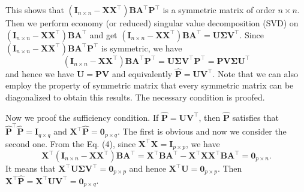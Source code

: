 \documentclass[titlepage,11pt,twoside]{article}
\begin{document}
This shows that $(\mathbf{I}_{n\times n}-\mathbf{X}\mathbf{X}^{\top})\mathbf{B}\mathbf{A}^{\top}\mathbf{P}^{\top}$ is a symmetric matrix of order $n\times n$. Then we perform economy (or reduced) singular value decomposition (SVD) on $(\mathbf{I}_{n\times n}-\mathbf{X}\mathbf{X}^{\top})\mathbf{B}\mathbf{A}^{\top}$ and get 
$(\mathbf{I}_{n\times n}-\mathbf{X}\mathbf{X}^{\top})\mathbf{B}\mathbf{A}^{\top}=\mathbf{U}\mathbf{\Sigma}\mathbf{V}^{\top}$.
Since $(\mathbf{I}_{n\times n}-\mathbf{X}\mathbf{X}^{\top})\mathbf{B}\mathbf{A}^{\top}\mathbf{P}^{\top}$ is symmetric, we have
\begin{equation}
(\mathbf{I}_{n\times n}-\mathbf{X}\mathbf{X}^{\top})\mathbf{B}\mathbf{A}^{\top}\mathbf{P}^{\top}
=
\mathbf{U}\mathbf{\Sigma}\mathbf{V}^{\top}\mathbf{P}^{\top}
=
\mathbf{P}\mathbf{V}\mathbf{\Sigma}\mathbf{U}^{\top}
\end{equation}
and hence we have $\mathbf{U}=\mathbf{P}\mathbf{V}$ and equivalently $\mathbf{\hat{P}}=\mathbf{U}\mathbf{V}^{\top}$. Note that we can also employ the property of symmetric matrix that every symmetric matrix can be diagonalized to obtain this results. The necessary condition is proofed. 

Now we proof the sufficiency condition. If $\mathbf{\hat{P}}=\mathbf{U}\mathbf{V}^{\top}$, then $\mathbf{\hat{P}}$ satisfies that $\mathbf{\hat{P}}^{\top}\mathbf{\hat{P}}=\mathbf{I}_{q\times q}$ and $\mathbf{X}^{\top}\mathbf{\hat{P}}=\mathbf{0}_{p\times q}$. The first is obvious and now we consider the second one. From the Eq. (4), since $\mathbf{X}^{\top}\mathbf{X}=\mathbf{I}_{p\times p}$, we have  
\begin{equation}
\mathbf{X}^{\top}(\mathbf{I}_{n\times n}-\mathbf{X}\mathbf{X}^{\top})\mathbf{B}\mathbf{A}^{\top}=\mathbf{X}^{\top}\mathbf{B}\mathbf{A}^{\top}-\mathbf{X}^{\top}\mathbf{X}\mathbf{X}^{\top}\mathbf{B}\mathbf{A}^{\top}
=
\mathbf{0}_{p\times n}
.
\end{equation}
It means that $\mathbf{X}^{\top}\mathbf{U}\mathbf{\Sigma}\mathbf{V}^{\top}=\mathbf{0}_{p\times p}$ and hence $\mathbf{X}^{\top}\mathbf{U}=\mathbf{0}_{p\times p}$. Then $\mathbf{X}^{\top}\mathbf{\hat{P}}=\mathbf{X}^{\top}\mathbf{U}\mathbf{V}^{\top}=\mathbf{0}_{p\times q}$.
\end{document}
